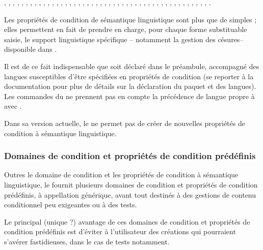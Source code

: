 \documentclass{article}
\begin{document}
\begin{valenum}
    {, , , , , , , , , , , , , , , , , , , , , , , , , , , , , , , , , , , , , , , , , , , , , , , .}
\end{valenum}

Les propriétés de condition de sémantique linguistique sont plus que de simples  ; elles permettent en fait de prendre en charge, pour chaque forme substituable saisie, le support linguistique spécifique -- notamment la gestion des césures-- disponible dans .

Il est de ce fait indispensable que  soit déclaré dans le préambule, accompagné des langues susceptibles d'être spécifiées en propriétés de condition (se reporter à la documentation  pour plus de détails sur la déclaration du paquet et des langues). Les commandes du  ne prennent pas en compte la précédence de langue propre à  avec .

Dans sa version actuelle, le  ne permet pas de créer de nouvelles propriétés de condition à sémantique linguistique.

\subsubsection{Domaines de condition et propriétés de condition prédéfinis}
Outres le domaine de condition  et les propriétés de condition à sémantique linguistique, le  fournit plusieurs domaines de condition et propriétés de condition prédéfinis, à appellation générique, avant tout destinés à des gestions de contenu conditionnel peu exigeantes ou à des tests.

Le principal (unique ?) avantage de ces domaines de condition et propriétés de condition prédéfinis est d'éviter à l'utilisateur des créations qui pourraient s'avérer fastidieuses, dans le cas de tests notamment.
\end{document}
